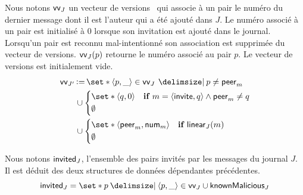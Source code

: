 Nous notons $\operatorname{\mathsf{vv}}_J$ un vecteur de versions~\autocite{parker_1983_versionvector,mattern_1988_timevector} qui associe à un pair le numéro du dernier message dont il est l'auteur qui a été ajouté dans $J$.
Le numéro associé à un pair est initialisé à $0$ lorsque son invitation est ajouté dans le journal.
Lorsqu'un pair est reconnu mal-intentionné son association est supprimée du vecteur de versions.
$\operatorname{\mathsf{vv}}_J(p)$ retourne le numéro associé au pair $p$.
Le vecteur de versions est initialement vide.
%
\begin{equation}\begin{split}
\MoveEqLeft\trm{vv}_{J'} \assign \set*{\tuple{p, \_} \in \trm{vv}_J \given p \neq \trm{peer}_m}\\
&\cup \begin{dcases}
        \set*{\tuple{q, 0}} & \when m = \tuple{\trm{invite}, q} \land \trm{peer}_m \neq q\\
        \emptyset &
    \end{dcases}\\
&\cup \begin{dcases}
        \set*{\tuple{\trm{peer}_m, \trm{num}_m}} & \when \trm{linear}_J(m)\\
        \emptyset &
    \end{dcases}
\end{split}\end{equation}

Nous notons $\operatorname{\mathsf{invited}}_J$, l'ensemble des pairs invités par les messages du journal $J$.
Il est déduit des deux structures de données dépendantes précédentes.
%
\begin{equation}
    \trm{invited}_{J} = \set*{p \given \tuple{p, \_} \in \trm{vv}_J} \cup \trm{knownMalicious}_J
\end{equation}


